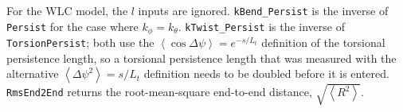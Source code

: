 \documentclass[11pt]{article}
\newcommand {\ttt} {\texttt}
\begin{document}
\begin{description}
For the WLC model, the $l$ inputs are ignored. \ttt{kBend\_Persist} is the inverse of \ttt{Persist} for the case where $k_\phi = k_\theta$. \ttt{kTwist\_Persist} is the inverse of \ttt{TorsionPersist}; both use the $\left< \cos \Delta \psi \right> = e^{-s/L_t}$ definition of the torsional persistence length, so a torsional persistence length that was measured with the alternative $\left< \Delta \psi^2 \right> = s/L_t$ definition needs to be doubled before it is entered. \ttt{RmsEnd2End} returns the root-mean-square end-to-end distance, $\sqrt{\left<R^2\right>}$.

\end{description}
\end{document}
